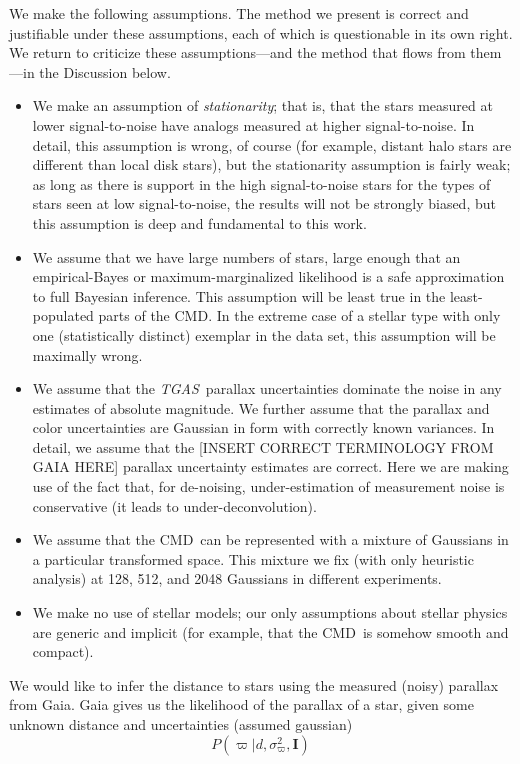 \documentclass[modern]{aastex61}
\newcommand{\acronym}[1]{{\small{#1}}}
\newcommand{\project}[1]{\textsl{#1}}
\newcommand{\tgas}{\project{\acronym{TGAS}}}
\newcommand{\cmd}{\acronym{CMD}}
\begin{document}
We make the following assumptions. The method we present is correct
and justifiable under these assumptions, each of which is questionable
in its own right. We return to criticize these assumptions---and the
method that flows from them---in the Discussion below.
\begin{itemize}
\item We make an assumption of \emph{stationarity}; that is, that the
  stars measured at lower signal-to-noise have analogs measured at
  higher signal-to-noise.  In detail, this assumption is wrong, of
  course (for example, distant halo stars are different than local
  disk stars), but the stationarity assumption is fairly weak; as long
  as there is support in the high signal-to-noise stars for the types
  of stars seen at low signal-to-noise, the results will not be
  strongly biased, but this assumption is deep and fundamental to this
  work.
\item We assume that we have large numbers of stars, large enough that
  an empirical-Bayes or maximum-marginalized likelihood is a safe
  approximation to full Bayesian inference. This assumption will be
  least true in the least-populated parts of the \cmd. In the extreme
  case of a stellar type with only one (statistically distinct)
  exemplar in the data set, this assumption will be maximally wrong.
\item We assume that the \tgas\ parallax uncertainties dominate the
  noise in any estimates of absolute magnitude. We further assume that
  the parallax and color uncertainties are Gaussian in form with
  correctly known variances. In detail, we assume that the [INSERT
    CORRECT TERMINOLOGY FROM GAIA HERE] parallax uncertainty estimates
  are correct. Here we are making use of the fact that, for
  de-noising, under-estimation of measurement noise is conservative
  (it leads to under-deconvolution).
\item We assume that the \cmd\ can be represented with a mixture of
  Gaussians in a particular transformed space. This mixture we fix
  (with only heuristic analysis) at 128, 512, and 2048 Gaussians in
  different experiments.
\item We make no use of stellar models; our only assumptions about
  stellar physics are generic and implicit (for example, that the
  \cmd\ is somehow smooth and compact).
\end{itemize}

We would like to infer the distance to stars using the measured (noisy) parallax from Gaia. Gaia gives us the likelihood of the parallax of a star, given some unknown distance and uncertainties (assumed gaussian)
\begin{equation}
\label{eq:likelihood}
P(\varpi |d, \sigma^2_{\varpi}, \textbf{I})
\end{equation}
\end{document}
